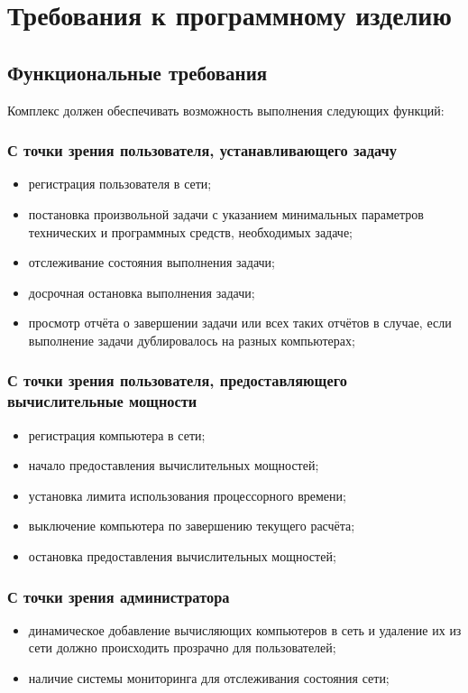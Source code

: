 \documentclass[a4paper,12pt]{report}
\numberwithin{equation}{section}
\begin{document}
\section{Требования к программному изделию}
\subsection{Функциональные требования}
Комплекс должен обеспечивать возможность выполнения следующих функций:
\subsubsection{С точки зрения пользователя, устанавливающего задачу}
\begin{itemize}
  \item регистрация пользователя в сети;
  \item постановка произвольной задачи с указанием минимальных параметров технических и программных средств, необходимых задаче;
  \item отслеживание состояния выполнения задачи;
  \item досрочная остановка выполнения задачи;
  \item просмотр отчёта о завершении задачи или всех таких отчётов в случае, если выполнение задачи дублировалось на разных компьютерах;
\end{itemize}

\subsubsection{С точки зрения пользователя, предоставляющего вычислительные мощности}
\begin{itemize}
  \item регистрация компьютера в сети;
  \item начало предоставления вычислительных мощностей;
  \item установка лимита использования процессорного времени;
  \item выключение компьютера по завершению текущего расчёта;
  \item остановка предоставления вычислительных мощностей;
\end{itemize}

\subsubsection{С точки зрения администратора}
\begin{itemize}
  \item динамическое добавление вычисляющих компьютеров в сеть и удаление их из сети должно происходить прозрачно для пользователей;
  \item наличие системы мониторинга для отслеживания состояния сети;
\end{itemize}
\end{document}
